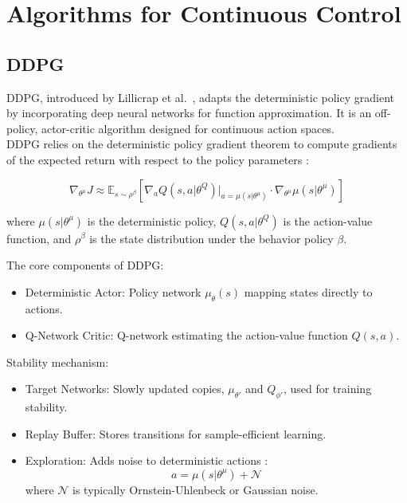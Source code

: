 \section{Algorithms for Continuous Control}

\subsection{\gls{DDPG}}
\gls{DDPG}, introduced by Lillicrap et al.~\cite{lillicrap2019continuouscontroldeepreinforcement}, adapts the deterministic policy gradient by incorporating deep neural networks for function approximation. It is an off-policy, actor-critic algorithm designed for continuous action spaces.\\

\noindent \gls{DDPG} relies on the deterministic policy gradient theorem to compute gradients of the expected return with respect to the policy parameters \cite{lillicrap2019continuouscontroldeepreinforcement}:

{\footnotesize
\begin{equation}
\nabla_{\theta^\mu} J \approx \mathbb{E}_{s \sim \rho^\beta}\left[\nabla_a Q(s, a|\theta^Q)\big|_{a=\mu(s|\theta^\mu)} \cdot \nabla_{\theta^\mu} \mu(s|\theta^\mu)\right]
\end{equation}
}

\noindent where $\mu(s|\theta^\mu)$ is the deterministic policy, $Q(s, a|\theta^Q)$ is the action-value function, and $\rho^\beta$ is the state distribution under the behavior policy $\beta$.

\noindent The core components of \gls{DDPG}:

\begin{itemize}
    \item Deterministic Actor: Policy network $\mu_\theta(s)$ mapping states directly to actions.
    \item Q-Network Critic: Q-network estimating the action-value function $Q(s, a)$.
\end{itemize}

\noindent Stability mechanism:
\begin{itemize}
    \item Target Networks: Slowly updated copies, $\mu_{\theta'}$ and $Q_{\phi'}$, used for training stability.
    \item Replay Buffer: Stores transitions for sample-efficient learning.
    \item Exploration: Adds noise to deterministic actions \cite{lillicrap2019continuouscontroldeepreinforcement}:
    \begin{equation}
    a = \mu(s|\theta^\mu) + \mathcal{N}
    \end{equation}
    where $\mathcal{N}$ is typically Ornstein-Uhlenbeck or Gaussian noise.
\end{itemize}

